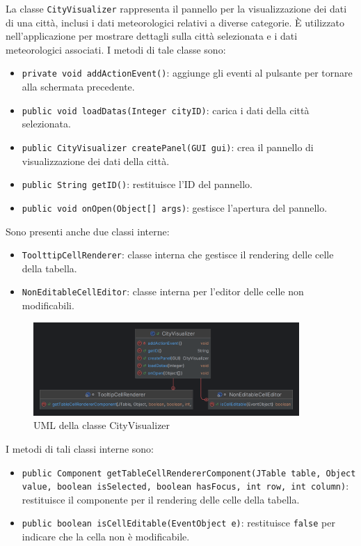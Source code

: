 La classe \texttt{CityVisualizer} rappresenta il pannello per la visualizzazione dei dati di una città, inclusi i dati meteorologici relativi a diverse categorie.
È utilizzato nell'applicazione per mostrare dettagli sulla città selezionata e i dati meteorologici associati.
I metodi di tale classe sono:
\begin{itemize}
    \item \texttt{private void addActionEvent()}: aggiunge gli eventi al pulsante per tornare alla schermata precedente.
    \item \texttt{public void loadDatas(Integer cityID)}: carica i dati della città selezionata.
    \item \texttt{public CityVisualizer createPanel(GUI gui)}: crea il pannello di visualizzazione dei dati della città.
    \item \texttt{public String getID()}: restituisce l'ID del pannello.
    \item \texttt{public void onOpen(Object[] args)}: gestisce l'apertura del pannello.
\end{itemize}
Sono presenti anche due classi interne:
\begin{itemize}
    \item \texttt{ToolttipCellRenderer}: classe interna che gestisce il rendering delle celle della tabella.
    \item \texttt{NonEditableCellEditor}: classe interna per l'editor delle celle non modificabili.
\end{itemize}

\begin{figure}[H]
    \centering
    \includegraphics[width=0.9\textwidth]{img/cityVisualizerUML.png}
    \caption{UML della classe CityVisualizer}
    \label{fig:UMLCityVisualizer}
\end{figure}

I metodi di tali classi interne sono:
\begin{itemize}
    \item \texttt{public Component getTableCellRendererComponent(JTable table, Object value, boolean isSelected, boolean hasFocus, int row, int column)}: restituisce il componente per il rendering delle celle della tabella.
    \item \texttt{public boolean isCellEditable(EventObject e)}: restituisce \texttt{false} per indicare che la cella non è modificabile.
\end{itemize}

